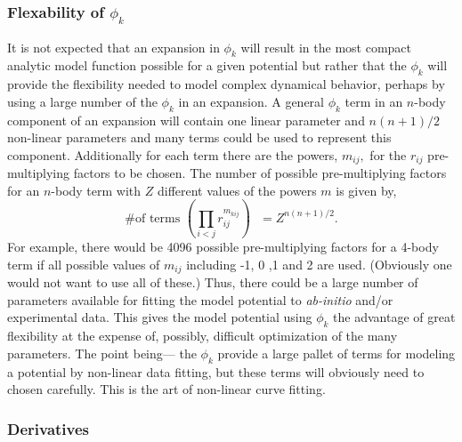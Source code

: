 \documentclass[12pt,thmsa]{article}
\begin{document}
\subsubsection{Flexability of $\phi _k$}

It is not expected that an expansion in $\phi _k$ will result in the most
compact analytic model function possible for a given potential but rather
that the $\phi _k$ will provide the flexibility needed to model complex
dynamical behavior, perhaps by using a large number of the $\phi _k$ in an
expansion. A general $\phi _k$ term in an $n$-body component of an expansion
will contain one linear parameter and $n\left( n+1\right) /2$ non-linear
parameters and many terms could be used to represent this component.
Additionally for each term there are the powers, $m_{ij},$ for the $r_{ij}$
pre-multiplying factors to be chosen. The number of possible pre-multiplying
factors for an $n$-body term with $Z$ different values of the powers $m$ is
given by, 
\begin{equation}
\text{\# of terms }\left( \prod_{i<j}r_{ij}^{m_{kij}}\right) \text{ }%
=Z^{n\left( n+1\right) /2}.
\end{equation}
For example, there would be 4096 possible pre-multiplying factors for a
4-body term if all possible values of $m_{ij}$ including -1, 0 ,1 and 2 are
used. (Obviously one would not want to use all of these.) Thus, there could
be a large number of parameters available for fitting the model potential to 
\emph{ab-initio} and/or experimental data. This gives the model potential
using $\phi _k$ the advantage of great flexibility at the expense of,
possibly, difficult optimization of the many parameters. The point being---
the $\phi _k$ provide a large pallet of terms for modeling a potential by
non-linear data fitting, but these terms will obviously need to chosen
carefully. This is the art of non-linear curve fitting.

\subsubsection{Derivatives}
\end{document}

